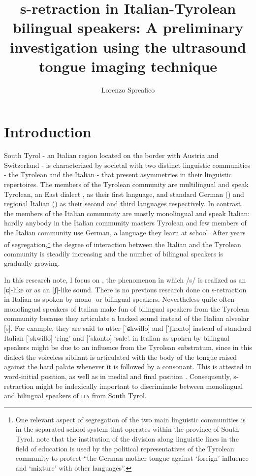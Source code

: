 \documentclass[output=paper]{LSP/langsci}
\author{Lorenzo Spreafico\affiliation{Free University of Bozen-Bolzano}}
\title{s-retraction in Italian-Tyrolean bilingual speakers: A preliminary investigation using the ultrasound tongue imaging technique}
\begin{document}
  
\section{Introduction}
South Tyrol - an Italian region located on the border with Austria and Switzerland - is characterized by societal  with two distinct linguistic communities - the Tyrolean and the Italian - that present asymmetries in their linguistic repertoires. The members of the Tyrolean community are multilingual and speak Tyrolean, an East  dialect \citep{wiesinger_einteilung_1983,russ_central_1990}, as their first language, and standard German (\citealt{ciccolone_lo_2010}) and regional Italian (\citealt{mioni_litaliano_2001}) as their second and third languages respectively. In contrast, the members of the Italian community are mostly monolingual and speak Italian: hardly anybody in the Italian community masters Tyrolean and few members of the Italian community use German, a language they learn at school. After years of segregation,\footnote{One relevant aspect of segregation of the two main linguistic communities is in the separated school system that operates within the province of South Tyrol. \citet[237]{woelk_educational_2008} note that the institution of the division along linguistic lines in the field of education is used by the political representatives of the Tyrolean community to protect “the German mother tongue against `foreign' influence and `mixture' with other languages”.} the degree of interaction between the Italian and the Tyrolean community is steadily increasing and the number of bilingual speakers is gradually growing.

In this research note, I focus on , the phenomenon in which /s/ is realized as an [ɕ]-like or as an [ʃ]-like sound. There is no previous research done on s-retraction in Italian as spoken by mono- or bilingual speakers. Nevertheless quite often monolingual speakers of Italian make fun of bilingual speakers from the Tyrolean community because they articulate a backed sound instead of the Italian alveolar [s]. For example, they are said to utter [ˈɕkwillo] and [ˈʃkonto] instead of standard Italian [ˈskwillo] `ring' and [ˈskonto] `sale'.  in Italian as spoken by bilingual speakers might be due to an influence from the Tyrolean substratum, since in this dialect the voiceless sibilant is articulated with the body of the tongue raised against the hard palate whenever it is followed by a consonant. This is attested in word-initial position, as well as in medial and final position \citep{alber_regional_2001,alber_silbenonset_2005}. Consequently, s-retraction might be indexically important to discriminate between monolingual and bilingual speakers of \textsc{ita} from South Tyrol.
\end{document}
